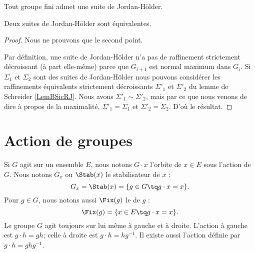 \begin{theorem}\label{ThoLgxWIC}
    Tout groupe fini admet une suite de Jordan-Hölder.

    Deux suites de Jordan-Hölder sont équivalentes.
\end{theorem}

\begin{proof}
    Nous ne prouvons que le second point.

    Par définition, une suite de Jordan-Hölder n'a pas de raffinement strictement décroissant (à part elle-même) parce que \( G_{i+1}\) est normal maximum dans \( G_i\). Si \( \Sigma_1\) et \( \Sigma_2\) sont des suites de Jordan-Hölder nous pouvons considérer les raffinements équivalents strictement décroissants \( \Sigma'_1\) et \( \Sigma'_2\) du lemme de Schreider \ref{LemBSicRJ}. Nous avons \( \Sigma'_1\sim\Sigma'_2\), mais par ce que nous venons de dire à propos de la maximalité, \( \Sigma'_1=\Sigma_1\) et \( \Sigma'_2=\Sigma_2\). D'où le résultat.
\end{proof}

\section{Action de groupes}

Si \( G\) agit sur un ensemble \( E\), nous notons \( G\cdot x\) l'orbite de \( x\in E\) sous l'action de $G$. Nous notons \( G_x\) ou \( \Stab(x)\) le stabilisateur de \( x\) :
\begin{equation}
    G_x=\Stab(x)=\{ g\in G\tq g\cdot x=x \}.
\end{equation}
Pour \( g\in G\), nous notons aussi \( \Fix(g)\) le  de \( g\) :
\begin{equation}
    \Fix(g)=\{ x\in E\tq g\cdot x=x \}.
\end{equation}
Le groupe \( G\) agit toujours sur lui même à gauche et à droite. L'action à gauche est \( g\cdot h=gh\); celle à droite est \( g\cdot h=hg^{-1}\). Il existe aussi l'action  définie par \( g\cdot h=ghg^{-1}\).

